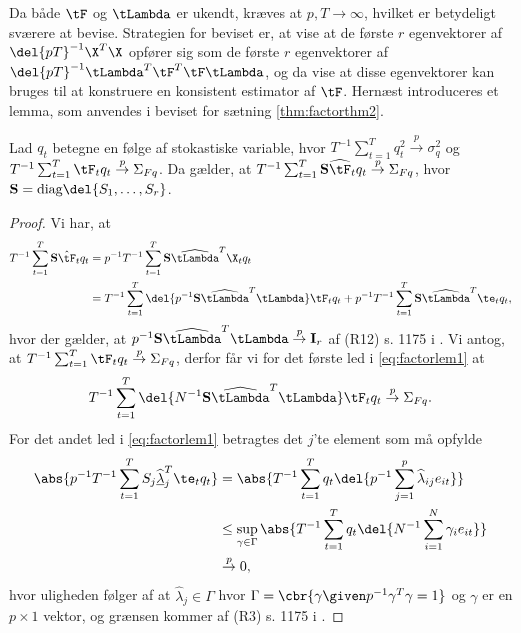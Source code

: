 Da både \(\tF\) og \(\tLambda\) er ukendt, kræves at \(p, T \rightarrow \infty\), hvilket er betydeligt sværere at bevise.
Strategien for beviset er, at vise at de første \(r\) egenvektorer af \(\del{pT}^{-1} \X^T \X\) opfører sig som de første \(r\) egenvektorer af \(\del{pT}^{-1} \tLambda^T \tF^T \tF \tLambda\), og da vise at disse egenvektorer kan bruges til at konstruere en konsistent estimator af \(\tF\).
\newpage
Hernæst introduceres et lemma, som anvendes i beviset for sætning \ref{thm:factorthm2}.
%
\begin{lem} \label{lem:factorlem1}
Lad \(q_t\) betegne en følge af stokastiske variable, hvor \(T^{-1} \sum_{t=1}^T q_t^2 \overset{p}{\rightarrow} \sigma_q^2\) og \(T^{-1} \sum_{t=1}^T \tF_t q_t \overset{p}{\rightarrow} \Sigma_{Fq}\).
Da gælder, at \(T^{-1} \sum_{t=1}^T \mathbf{S} \widehat{\tF}_t q_t \overset{p}{\rightarrow} \Sigma_{Fq}\), hvor \(\mathbf{S} = \text{diag} \del{S_1, \ldots, S_r}\).
\end{lem}
%
\begin{proof}
Vi har, at
\begin{align}
T^{-1} \sum_{t=1}^T \mathbf{S} \hat{\tF}_t q_t &=p^{-1} T^{-1} \sum_{t=1}^T \mathbf{S} \widehat{\tLambda}^T \X_t q_t \nonumber \\
&= T^{-1} \sum_{t=1}^T \del{p^{-1} \mathbf{S} \widehat{\tLambda}^T \tLambda} \tF_t q_t + p^{-1} T^{-1} \sum_{t=1}^T \mathbf{S} \widehat{\tLambda}^T \te_t q_t, \label{eq:factorlem1}
\end{align}
hvor der gælder, at \(p^{-1} \mathbf{S} \widehat{\tLambda}^T \tLambda \overset{p}{\rightarrow} \mathbf{I}_r\) af (R12) s. 1175 i \citep{stock_watson_2002a}.
Vi antog, at \(T^{-1} \sum_{t=1}^T \tF_t q_t \overset{p}{\rightarrow} \Sigma_{Fq}\), derfor får vi for det første led i \eqref{eq:factorlem1} at
\begin{align*}
T^{-1} \sum_{t=1}^T \del{N^{-1} \mathbf{S} \widehat{\tLambda}^T \tLambda} \tF_t q_t \overset{p}{\rightarrow} \Sigma_{Fq}.
\end{align*}
For det andet led i \eqref{eq:factorlem1} betragtes det \(j\)'te element som må opfylde
\begin{align*}
\abs{p^{-1} T^{-1} \sum_{t=1}^T S_j \underline{\widehat{\lambda}}_j^T \te_t q_t} &= \abs{T^{-1} \sum_{t=1}^T q_t \del{p^{-1} \sum_{j=1}^p \widehat{\lambda}_{ij} e_{it}}} \\
& \leq \sup_{\gamma \in \Gamma} \abs{T^{-1} \sum_{t=1}^T q_t \del{N^{-1} \sum_{i=1}^N \gamma_i e_{it}}} \\
& \overset{p}{\rightarrow} 0,
\end{align*}
hvor uligheden følger af at \(\widehat{\lambda}_j \in \Gamma\) hvor \(\Gamma = \cbr{\gamma \given p^{-1} \gamma^T \gamma = 1}\) og \(\gamma\) er en \(p \times 1\) vektor, og grænsen kommer af (R3) s. 1175 i \citep{stock_watson_2002a}.
\end{proof}

